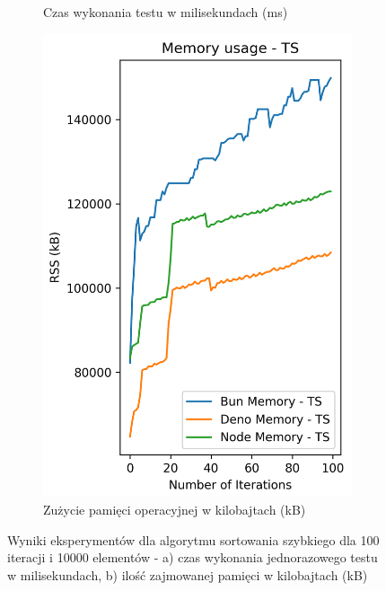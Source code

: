 \begin{figure}[H]
\begin{subfigure}[b]{0.42\textwidth}
    \caption{Czas wykonania testu w milisekundach (ms)}
    \label{fig:quick_sorting_e3_ts_time}
  \end{subfigure}
  \begin{subfigure}[b]{0.42\textwidth}
    \centering
    \includegraphics[width=\textwidth]{Figures/sorting/sorting_quick_100_10000_ts_memory.png}
    \caption{Zużycie pamięci operacyjnej w kilobajtach (kB)}
    \label{fig:quick_sorting_e3_ts_memory}
  \end{subfigure}
  \caption{Wyniki eksperymentów dla algorytmu sortowania szybkiego dla 100 iteracji i 10000 elementów - a) czas wykonania jednorazowego testu w milisekundach, b) ilość zajmowanej pamięci w kilobajtach (kB)}
  \label{fig:quick_sorting_e3_ts}
\end{figure}

